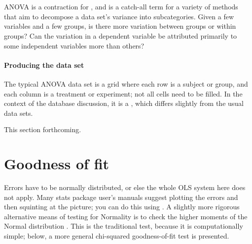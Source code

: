 
\section{} ANOVA is a contraction for , and is a catch-all term for a variety of methods that
aim to decompose a data set's variance into subcategories. Given a few
variables and a few groups, is there more variation between groups or
within groups? Can the variation in a dependent variable be attributed
primarily to some independent variables more than others?

\paragraph{Producing the data set} The typical ANOVA data set is a grid
where each row is a subject or group, and each column is a treatment or
experiment; not all cells need to be filled. In the context of the
database discussion, it is a , which differs slightly
from the usual data sets.

This section forthcoming.

\section{Goodness of fit}

Errors have to be normally distributed, or else
the whole OLS system here does not apply. Many stats package user's manuals
suggest plotting the errors and then squinting at the picture; you can
do this using . 
A slightly more rigorous alternative means of testing for Normality
is to check the higher moments of the Normal distribution
\citep{bowman:shenton}.  This is the
traditional test, because it is computationally simple; below, a more
general chi-squared goodness-of-fit test is presented.

